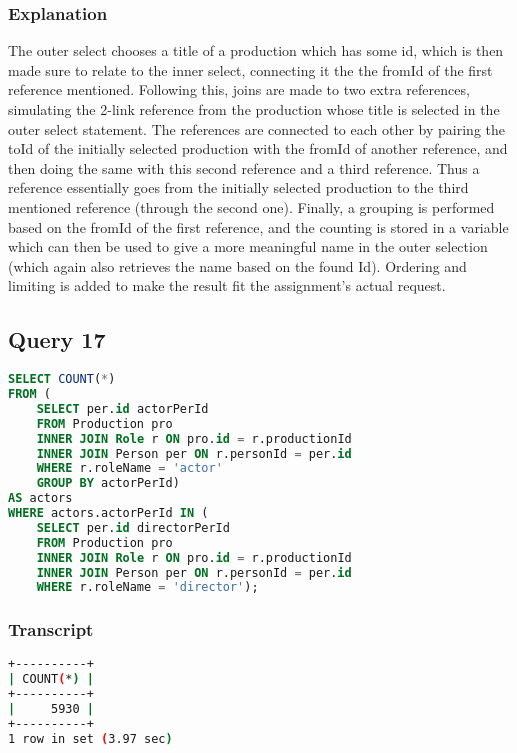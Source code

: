 \subsubsection{Explanation}
The outer select chooses a title of a production which has some id, which is then made sure to relate to the inner select, connecting it the the fromId of the first reference mentioned. Following this, joins are made to two extra references, simulating the 2-link reference from the production whose title is selected in the outer select statement. The references are connected to each other by pairing the toId of the initially selected production with the fromId of another reference, and then doing the same with this second reference and a third reference. Thus a reference essentially goes from the initially selected production to the third mentioned reference (through the second one). Finally, a grouping is performed based on the fromId of the first reference, and the counting is stored in a variable which can then be used to give a more meaningful name in the outer selection (which again also retrieves the name based on the found Id). Ordering and limiting is added to make the result fit the assignment's actual request.


\bigskip
\subsection{Query 17}
\begin{lstlisting}[language=sql]
SELECT COUNT(*)
FROM (
	SELECT per.id actorPerId
	FROM Production pro
	INNER JOIN Role r ON pro.id = r.productionId
	INNER JOIN Person per ON r.personId = per.id
	WHERE r.roleName = 'actor'
	GROUP BY actorPerId)
AS actors
WHERE actors.actorPerId IN (
	SELECT per.id directorPerId
	FROM Production pro
	INNER JOIN Role r ON pro.id = r.productionId
	INNER JOIN Person per ON r.personId = per.id
	WHERE r.roleName = 'director');
\end{lstlisting}

\subsubsection{Transcript}
\begin{lstlisting}[language=bash]
+----------+
| COUNT(*) |
+----------+
|     5930 |
+----------+
1 row in set (3.97 sec)
\end{lstlisting}

